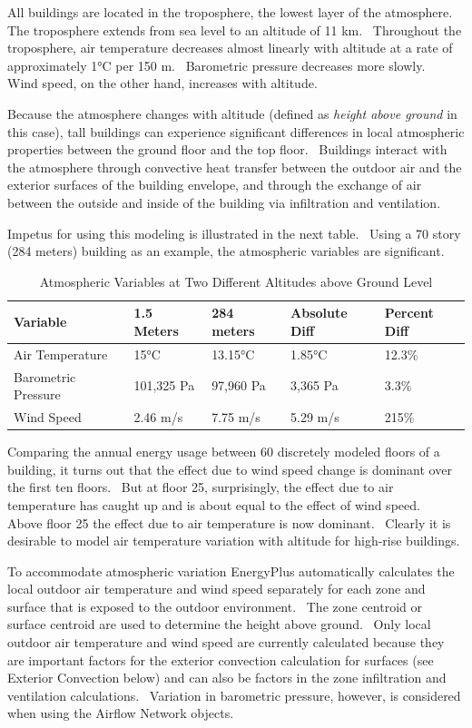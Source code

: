 All buildings are located in the troposphere, the lowest layer of the atmosphere.~ The troposphere extends from sea level to an altitude of 11 km.~ Throughout the troposphere, air temperature decreases almost linearly with altitude at a rate of approximately 1°C per 150 m.~ Barometric pressure decreases more slowly.~ Wind speed, on the other hand, increases with altitude.

Because the atmosphere changes with altitude (defined as \emph{height above ground} in this case), tall buildings can experience significant differences in local atmospheric properties between the ground floor and the top floor. ~Buildings interact with the atmosphere through convective heat transfer between the outdoor air and the exterior surfaces of the building envelope, and through the exchange of air between the outside and inside of the building via infiltration and ventilation.

Impetus for using this modeling is illustrated in the next table.~ Using a 70 story (284 meters) building as an example, the atmospheric variables are significant.

\begin{longtable}[c]{@{}lllll@{}}
\caption{Atmospheric Variables at Two Different Altitudes above Ground Level \label{table:atmospheric-variables-at-two-different}} \tabularnewline
\toprule 
Variable & 1.5 Meters & 284 meters & Absolute Diff & Percent Diff \tabularnewline \midrule
\endhead

Air Temperature & 15°C & 13.15°C & 1.85°C & 12.3\% \tabularnewline
Barometric Pressure & 101,325 Pa & 97,960 Pa & 3,365 Pa & 3.3\% \tabularnewline
Wind Speed & 2.46 m/s & 7.75 m/s & 5.29 m/s & 215\% \tabularnewline
\bottomrule
\end{longtable}

Comparing the annual energy usage between 60 discretely modeled floors of a building, it turns out that the effect due to wind speed change is dominant over the first ten floors.~ But at floor 25, surprisingly, the effect due to air temperature has caught up and is about equal to the effect of wind speed.~ Above floor 25 the effect due to air temperature is now dominant.~ Clearly it is desirable to model air temperature variation with altitude for high-rise buildings.

To accommodate atmospheric variation EnergyPlus automatically calculates the local outdoor air temperature and wind speed separately for each zone and surface that is exposed to the outdoor environment.~ The zone centroid or surface centroid are used to determine the height above ground.~ Only local outdoor air temperature and wind speed are currently calculated because they are important factors for the exterior convection calculation for surfaces (see Exterior Convection below) and can also be factors in the zone infiltration and ventilation calculations.~ Variation in barometric pressure, however, is considered when using the Airflow Network objects.

